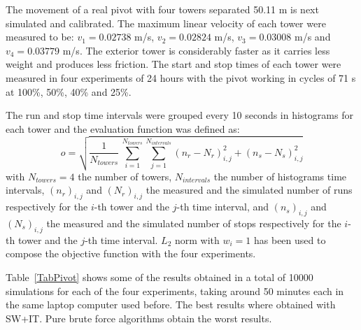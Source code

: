 \documentclass[review,authoryear]{elsarticle}
\newcommand{\EQ}[2]
{\begin{equation}#1\label{#2}\end{equation}}
\newcommand{\PA}[1]{\left(#1\right)}
\begin{document}
The movement of a real pivot with four towers separated 50.11 m is next simulated and calibrated. The maximum linear velocity of each tower were measured to be: $v_1=0.02738$ m/s, $v_2=0.02824$ m/s, $v_3=0.03008$ m/s and $v_4=0.03779$ m/s.
The exterior tower is considerably faster as it carries less weight and produces less friction.
The start and stop times of each tower were measured in four experiments of 24 hours with the pivot working in cycles of 71 s at 100\%, 50\%, 40\% and 25\%.

The run and stop time intervals were grouped every 10 seconds in histograms for each tower and the evaluation function was defined as:
\EQ
{
	o=\sqrt{\frac{1}{N_{towers}}\,\sum_{i=1}^{N_{towers}}
	\sum_{j=1}^{N_{intervals}}\PA{n_r-N_r}_{i,j}^2+\PA{n_s-N_s}_{i,j}^2}
}{EqPivotObjective}
with $N_{towers}=4$ the number of towers, $N_{intervals}$ the number of
histograms time intervals, $\PA{n_r}_{i,j}$ and $\PA{N_r}_{i,j}$ the measured
and the simulated number of runs respectively for the $i$-th tower and the
$j$-th time interval, and $\PA{n_s}_{i,j}$ and $\PA{N_s}_{i,j}$ the measured
and the simulated number of stops respectively for the $i$-th tower and the
$j$-th time interval. $L_2$ norm with $w_i=1$ has been used to compose the
objective function with the four experiments.

Table~\ref{TabPivot} shows some of the results obtained in a total of 10000 simulations for each of the four experiments, taking around 50 minutes each in the same laptop computer used before. The best results where obtained with SW+IT.
Pure brute force algorithms obtain the worst results.
\end{document}
